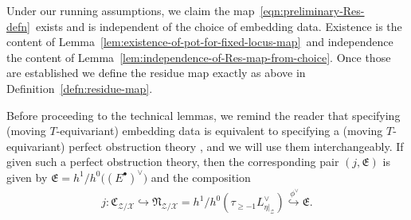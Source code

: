 \documentclass[12pt,dvipsnames]{amsart}
\begin{document}
Under our running assumptions, we claim the map~\eqref{eqn:preliminary-Res-defn}~exists and is independent of the choice of embedding data. Existence is the content of Lemma~\ref{lem:existence-of-pot-for-fixed-locus-map}~and independence the content of Lemma~\ref{lem:independence-of-Res-map-from-choice}. Once those are established we define the residue map exactly as above in Definition~\ref{defn:residue-map}.

\begin{remark}\label{rl-000W}\label{rmk:embedding-data-is-POT}
  Before proceeding to the technical lemmas, we remind the reader that specifying (moving \(T\)-equivariant) embedding data is equivalent to specifying a (moving \(T\)-equivariant) perfect obstruction theory \cite[Prop. 3.11]{manolache_VirtualPullbacks2012}, and we will use them interchangeably. If given such a perfect obstruction theory, then the corresponding pair \((j,\mathfrak E)\) is given by \(\mathfrak E = h^1/h^0\big((E^\bullet)^\vee\big)\) and the composition
  \begin{align*}
    j: \mathfrak C_{\mathcal Z/\mathcal X} \hookrightarrow \mathfrak N_{\mathcal Z/\mathcal X} = h^1/h^0(\tau_{\geq -1}L_{\eta|_{\mathcal Z}}^\vee) \overset{~\phi^\vee}{\hookrightarrow}\mathfrak E.
  \end{align*}
\end{remark}
\end{document}

